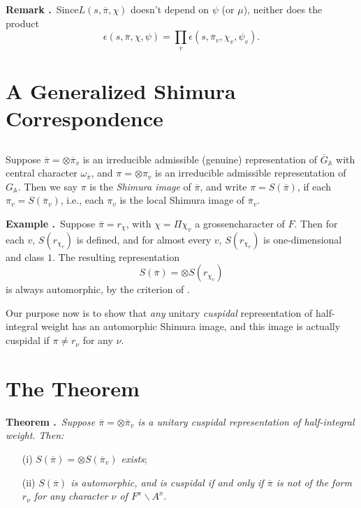 \medskip
\noindent
{\bf Remark .\label{art1-rem13.4}}~Since\pageoriginale $L(s,\overline{\pi},\chi)$ doesn't depend on $\psi$ (or $\mu$), neither does the product
$$
\epsilon(s,\overline{\pi},\chi,\psi)=\prod\limits_{v}\epsilon(s,\overline{\pi}_{v},\chi_{v},\psi_{v}).
$$

\section{A Generalized Shimura Correspondence}\label{art1-sec14}

\subsection{}\label{art1-sec14.1}
Suppose $\overline{\pi}=\otimes \overline{\pi}_{v}$ is an irreducible admissible (genuine) representation of $\overline{G}_{\mathbb{A}}$ with central character $\omega_{\overline{\pi}}$, and $\pi=\otimes \pi_{v}$ is an irreducible admissible representation of $G_{\mathbb{A}}$. Then we say $\pi$ is the {\em Shimura image} of $\overline{\pi}$, and write $\pi=S(\overline{\pi})$, if each $\pi_{v}=S(\overline{\pi}_{v})$, i.e., each $\pi_{v}$ is the local Shimura image of $\overline{\pi}_{v}$.

\medskip
\noindent
{\bf Example .\label{art1-exam14.2}}~Suppose $\overline{\pi}=r_{\chi}$, with $\chi=\Pi \chi_{v}$ a grossencharacter of $F$. Then for each $v$, $S(r_{\chi_{v}})$ is defined, and for almost every $v$, $S(r_{\chi_{v}})$ is one-dimensional and class $1$. The resulting representation
$$
S(\overline{\pi})=\otimes S(r_{\chi_{v}})
$$
is always automorphic, by the criterion of \cite{Langlands}.

Our purpose now is to show that {\em any} unitary {\em cuspidal} representation of half-integral weight has an automorphic Shimura image, and this image is actually cuspidal if $\pi\neq r_{\nu}$ for any $\nu$.

\section{The Theorem}\label{art1-sec15}

\noindent
{\bf Theorem .\label{art1-thm15.1}}~{\em Suppose $\overline{\pi}=\otimes \overline{\pi}_{v}$ is a unitary cuspidal representation of half-integral weight. Then:}
\begin{itemize}
\item[(i)] {\em $S(\overline{\pi})=\otimes S(\overline{\pi}_{v})$ exists};

\item[(ii)] {\em $S(\overline{\pi})$ is automorphic, and is cuspidal if and only if $\overline{\pi}$ is not of the form $r_{\nu}$ for any character $\nu$ of $F^{x}\backslash A^{x}$}.
\end{itemize}

